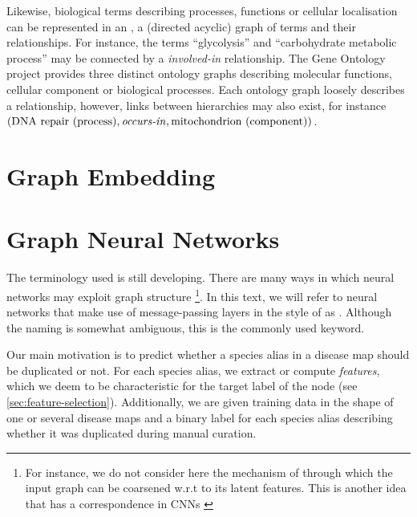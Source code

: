 \documentclass[
	fontsize=10pt, %
	twoside=false, %
	secnumdepth=1, %
]{kaobook}
\begin{document}
Likewise, biological terms describing processes, functions or cellular
localisation can be represented in an , a (directed acyclic) graph
of terms and their relationships. For instance, the terms ``glycolysis'' and
``carbohydrate metabolic process'' may be connected by a \textit{involved-in}
relationship. The Gene Ontology project \cite{ashburner_GeneOntologyTool_2000}
provides three distinct ontology graphs describing molecular functions, cellular
component or biological processes. Each ontology graph loosely describes a
relationship, however, links between hierarchies may also exist, for instance
$(\text{DNA repair (process)}, \text{\textit{occurs-in}}, \text{mitochondrion (component)})$.


\section{Graph Embedding}


\section{Graph Neural Networks}
\label{sec:neural-networks}

The terminology used is still developing. There are many ways in which neural
networks may exploit graph structure \footnote{
  For instance, we do not consider here the mechanism of  through
  which the input graph can be coarsened w.r.t to its latent features.
\cite{ying_hierarchical_2019}
This is another idea that has a correspondence in CNNs
\cite{zhang_dive_nodate}
}. In this text, we will refer to neural
networks that make use of message-passing layers in the style of
 as . Although the naming is
somewhat ambiguous, this is the commonly used keyword.


Our main motivation is to predict whether a species alias in a disease map
should be duplicated or not. For each species alias, we extract or compute
\textit{features}, which we deem to be characteristic for the target label of
the node (see \ref{sec:feature-selection}). Additionally, we are given training
data in the shape of one or several disease maps and a binary label for each
species alias describing whether it was duplicated during manual curation.
\end{document}
